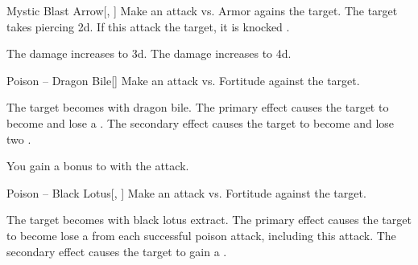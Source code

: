 \lowercase{\hypertarget{spell:Mystic Blast Arrow}{}}\label{spell:Mystic Blast Arrow}
\begin{freeability}[Rank 4]{\hypertarget{spell:Mystic Blast Arrow}{Mystic Blast Arrow}}[, ]
Make an attack vs. Armor agains the target.
\hit The target takes piercing  \plus2d.
If this attack  the target, it is knocked .

\rankline
{} The damage increases to  \plus3d.
 The damage increases to  \plus4d.
\end{freeability}
\vspace{0.25em}



\lowercase{\hypertarget{spell:Poison -- Dragon Bile}{}}\label{spell:Poison -- Dragon Bile}
\begin{freeability}[Rank 5]{\hypertarget{spell:Poison -- Dragon Bile}{Poison -- Dragon Bile}}[]
Make an attack vs. Fortitude against the target.

\hit The target becomes  with dragon bile.
The primary effect causes the target to become  and lose a .
The secondary effect causes the target to become  and lose two .

\rankline
{} You gain a  bonus to  with the attack.
\end{freeability}
\vspace{0.25em}



\lowercase{\hypertarget{spell:Poison -- Black Lotus}{}}\label{spell:Poison -- Black Lotus}
\begin{freeability}[Rank 7]{\hypertarget{spell:Poison -- Black Lotus}{Poison -- Black Lotus}}[, ]
Make an attack vs. Fortitude against the target.

\hit The target becomes  with black lotus extract.
The primary effect causes the target to become lose a  from each successful poison attack, including this attack.
The secondary effect causes the target to gain a .
\end{freeability}
\vspace{0.25em}




